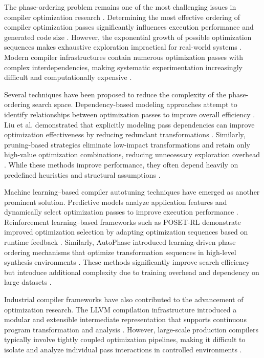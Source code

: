 \documentclass[conference]{IEEEtran}
\begin{document}
The phase-ordering problem remains one of the most challenging issues in compiler optimization research \cite{ref1}. Determining the most effective ordering of compiler optimization passes significantly influences execution performance and generated code size \cite{ref2}. However, the exponential growth of possible optimization sequences makes exhaustive exploration impractical for real-world systems \cite{ref19}. Modern compiler infrastructures contain numerous optimization passes with complex interdependencies, making systematic experimentation increasingly difficult and computationally expensive \cite{ref1}.

Several techniques have been proposed to reduce the complexity of the phase-ordering search space. Dependency-based modeling approaches attempt to identify relationships between optimization passes to improve overall efficiency \cite{ref1}. Liu et al. demonstrated that explicitly modeling pass dependencies can improve optimization effectiveness by reducing redundant transformations \cite{ref1}. Similarly, pruning-based strategies eliminate low-impact transformations and retain only high-value optimization combinations, reducing unnecessary exploration overhead \cite{ref4}. While these methods improve performance, they often depend heavily on predefined heuristics and structural assumptions \cite{ref19}.

Machine learning–based compiler autotuning techniques have emerged as another prominent solution. Predictive models analyze application features and dynamically select optimization passes to improve execution performance \cite{ref8}. Reinforcement learning–based frameworks such as POSET-RL demonstrate improved optimization selection by adapting optimization sequences based on runtime feedback \cite{ref8}. Similarly, AutoPhase introduced learning-driven phase ordering mechanisms that optimize transformation sequences in high-level synthesis environments \cite{ref12}. These methods significantly improve search efficiency but introduce additional complexity due to training overhead and dependency on large datasets \cite{ref12}.

Industrial compiler frameworks have also contributed to the advancement of optimization research. The LLVM compilation infrastructure introduced a modular and extensible intermediate representation that supports continuous program transformation and analysis \cite{ref16}. However, large-scale production compilers typically involve tightly coupled optimization pipelines, making it difficult to isolate and analyze individual pass interactions in controlled environments \cite{ref16}.
\end{document}
